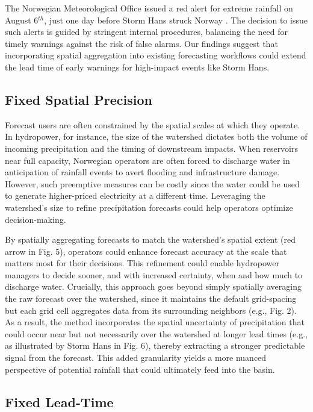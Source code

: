 \documentclass[preprint,12pt,authoryear]{elsarticle}
\begin{document}
The Norwegian Meteorological Office issued a red alert for extreme rainfall on August 6$^{th}$, just one day before Storm Hans struck Norway \citep{Granerod2023}. The decision to issue such alerts is guided by stringent internal procedures, balancing the need for timely warnings against the risk of false alarms. Our findings suggest that incorporating spatial aggregation into existing forecasting workflows could extend the lead time of early warnings for high-impact events like Storm Hans. 


\subsection{Fixed Spatial Precision} 

Forecast users are often constrained by the spatial scales at which they operate. In hydropower, for instance, the size of the watershed dictates both the volume of incoming precipitation and the timing of downstream impacts. When reservoirs near full capacity, Norwegian operators are often forced to discharge water in anticipation of rainfall events \citep{NRK2020,TV22024} to avert flooding and infrastructure damage. However, such preemptive measures can be costly since the water could be used to generate higher-priced electricity at a different time. Leveraging the watershed’s size to refine precipitation forecasts could help operators optimize decision-making.  


By spatially aggregating forecasts to match the watershed’s spatial extent (red arrow in Fig. 5), operators could enhance forecast accuracy at the scale that matters most for their decisions. This refinement could enable hydropower managers to decide sooner, and with increased certainty, when and how much to discharge water. Crucially, this approach goes beyond simply spatially averaging the raw forecast over the watershed, since it maintains the default grid-spacing but each grid cell aggregates data from its surrounding neighbors (e.g., Fig. 2). As a result, the method incorporates the spatial uncertainty of precipitation that could occur near but not necessarily over the watershed at longer lead times (e.g., as illustrated by Storm Hans in Fig. 6), thereby extracting a stronger predictable signal from the forecast. This added granularity yields a more nuanced perspective of potential rainfall that could ultimately feed into the basin.


\subsection{Fixed Lead-Time} 
\end{document}

